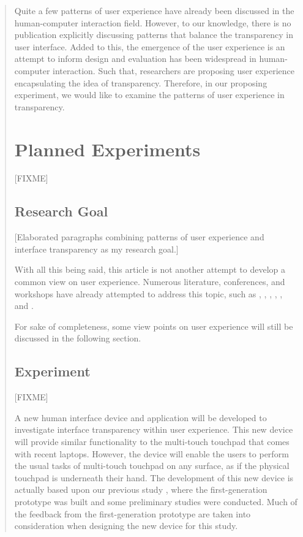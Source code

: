 \documentclass[a4paper,titlepage]{article}
\begin{document}
\begin{quote}
Quite a few patterns of user experience have already been discussed
\citep{participatory:dearden, speech:zajicek, unix:raymond,
  patterns:tidwell} in the human-computer interaction field. However,
to our knowledge, there is no publication explicitly discussing
patterns that balance the transparency in user interface. Added to
this, the emergence of the user experience is an attempt to inform
design and evaluation has been widespread in human-computer
interaction. Such that, researchers are proposing user experience
encapsulating the idea of transparency. Therefore, in our proposing
experiment, we would like to examine the patterns of user experience
in transparency.


\section{Planned Experiments}
\label{sec:experiment}
[FIXME]

\subsection{Research Goal}
[Elaborated paragraphs combining patterns of user experience and
  interface transparency as my research goal.]

With all this being said, this article is not another attempt to
develop a common view on user experience. Numerous literature,
conferences, and workshops have already attempted to address this
topic, such as \citet{early:forlizzi}, \citet{emotional:norman},
\citet{action:dourish}, \citet{ux:hassenzahl},
\citet{experience:desmet}, and \citet{ux:law}.

For sake of completeness, some view points on user experience will
still be discussed in the following section. 
\subsection{Experiment}
[FIXME]

A new human interface device and application will be developed to
investigate interface transparency within user experience. This new
device will provide similar functionality to the multi-touch touchpad
that comes with recent laptops. However, the device will enable the
users to perform the usual tasks of multi-touch touchpad on any
surface, as if the physical touchpad is underneath their hand. The
development of this new device is actually based upon our previous
study \citep{lmnt:huang}, where the first-generation prototype was
built and some preliminary studies were conducted. Much of the
feedback from the first-generation prototype are taken into
consideration when designing the new device for this study.


\end{quote}
\end{document}

